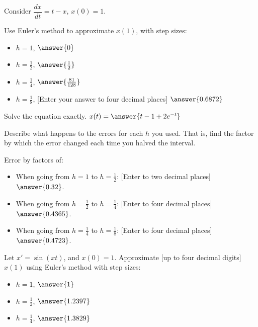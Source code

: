 \documentclass{ximera}
\begin{document}
\begin{exercise}
    Consider $\dfrac{dx}{dt} = t-x$, $x(0)=1$.
    
    Use Euler's method to approximate $x(1)$, with step sizes: 
    \begin{itemize}
        \item $h = 1$, $\answer{0}$
        \item $h = \frac{1}{2}$, $\answer{\frac{1}{2}}$
        \item $h = \frac{1}{4}$, $\answer{\frac{81}{128}}$
        \item $h = \frac{1}{8}$, [Enter your answer to four decimal places] $\answer{0.6872}$
    \end{itemize}
    
    \begin{problem}
        Solve the equation exactly. $x(t) = \answer{t-1+2e^{-t}}$
        \begin{problem}
            Describe what happens to the errors for each $h$ you used.  That is, find the factor by which the error changed each time you halved the interval.
            
            Error  by factors of: 
            \begin{itemize}
                \item When going from $h=1$ to $h=\frac{1}{2}$: [Enter to two decimal places] $\answer{0.32}$.
                \item When going from $h=\frac{1}{2}$ to $h=\frac{1}{4}$: [Enter to four decimal places] $\answer{0.4365}$.
                \item When going from $h=\frac{1}{4}$ to $h=\frac{1}{8}$: [Enter to four decimal places] $\answer{0.4723}$.
            \end{itemize}
        \end{problem}
    \end{problem}
\end{exercise}

\begin{exercise}%
    Let $x' = \sin(xt)$, and $x(0)=1$. Approximate [up to four decimal digits] $x(1)$ using Euler's method with step sizes:
    \begin{itemize}
        \item $h = 1$, $\answer{1}$
        \item $h = \frac{1}{2}$, $\answer{1.2397}$
        \item $h = \frac{1}{4}$, $\answer{1.3829}$
    \end{itemize}
\end{exercise}
\end{document}
